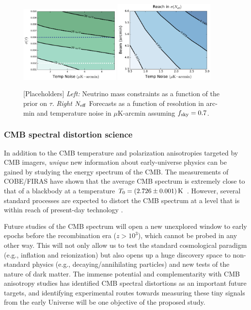 \begin{figure}[t!]
\begin{center}
\includegraphics[width=0.45\textwidth]{figs/Mnu_tauprior.pdf}
\includegraphics[width=0.45\textwidth]{figs/Neff_space.pdf}
\caption{ [Placeholders] {\it Left:} Neutrino mass constraints as a function of the prior on $\tau$.  {\it Right} ${N_{\rm eff}}$ Forecasts as a function of resolution in arc-min and temperature noise in $\mu$K-arcmin assuming $f_{\rm sky} = 0.7$.}
\label{fig:Neff_future}
\end{center}
\end{figure}



\vspace{-0.22in}
\subsubsection{CMB spectral distortion science}
\vspace{-0.05in}

In addition to the CMB temperature and polarization anisotropies targeted by CMB imagers, {\it unique} new information about early-universe physics can be gained by studying the energy spectrum of the CMB. The measurements of COBE/FIRAS have shown that the average CMB spectrum is extremely close to that of a blackbody at a temperature $T_0=(2.726\pm 0.001)\,{\rm K}$ \citep{Mather1994, Fixsen1996}. However, several standard processes are expected to distort the CMB spectrum at a level that is within reach of present-day technology \citep[e.g.,][]{Chluba2016}. 

Future studies of the CMB spectrum will open a new unexplored window to early epochs before the recombination era ($z > 10^3$), which cannot be probed in any other way. This will not only allow us to test the standard cosmological paradigm (e.g., inflation and reionization) but also opens up a huge discovery space to non-standard physics (e.g., decaying/annihilating particles) and new tests of the nature of dark matter. The immense potential and complementarity with CMB anisotropy studies has identified CMB spectral distortions as an important future targets, and identifying experimental routes towards measuring these tiny signals from the early Universe will be one objective of the proposed study.

